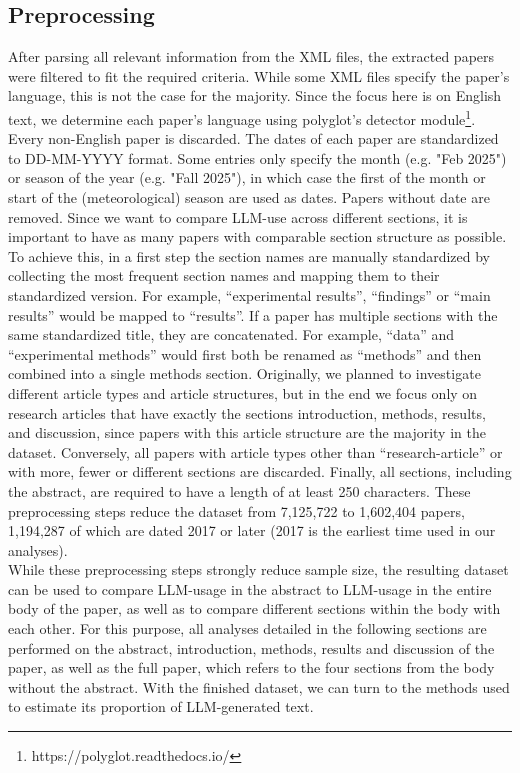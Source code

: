 \subsection{Preprocessing}
After parsing all relevant information from the XML files, the extracted papers were filtered to fit the required criteria.
While some XML files specify the paper's language, this is not the case for the majority.
Since the focus here is on English text, we determine each paper's language using polyglot's detector module\footnote{https://polyglot.readthedocs.io/}.
Every non-English paper is discarded.
The dates of each paper are standardized to DD-MM-YYYY format. 
Some entries only specify the month (e.g. "Feb 2025") or season of the year (e.g. "Fall 2025"), in which case the first of the month or start of the (meteorological) season are used as dates.
Papers without date are removed.
Since we want to compare LLM-use across different sections, it is important to have as many papers with comparable section structure as possible.
To achieve this, in a first step the section names are manually standardized by collecting the most frequent section names and mapping them to their standardized version.
For example, ``experimental results'', ``findings'' or ``main results'' would be mapped to ``results''.
If a paper has multiple sections with the same standardized title, they are concatenated.
For example, ``data'' and ``experimental methods'' would first both be renamed as ``methods'' and then combined into a single methods section.
Originally, we planned to investigate different article types and article structures, but in the end we focus only on research articles that have exactly the sections introduction, methods, results, and discussion, since papers with this article structure are the majority in the dataset. 
Conversely, all papers with article types other than ``research-article'' or with more, fewer or different sections are discarded.
Finally, all sections, including the abstract, are required to have a length of at least 250 characters.
These preprocessing steps reduce the dataset from 7,125,722 to 1,602,404 papers, 1,194,287 of which are dated 2017 or later 
(2017 is the earliest time used in our analyses).
\\
While these preprocessing steps strongly reduce sample size, the resulting dataset can be used to compare LLM-usage in the abstract to LLM-usage in the entire body of the paper, as well as to compare different sections within the body with each other.
For this purpose, all analyses detailed in the following sections are performed on the abstract, introduction, methods, results and discussion of the paper, as well as the full paper, which refers to the four sections from the body without the abstract.
With the finished dataset, we can turn to the methods used to estimate its proportion of LLM-generated text.


